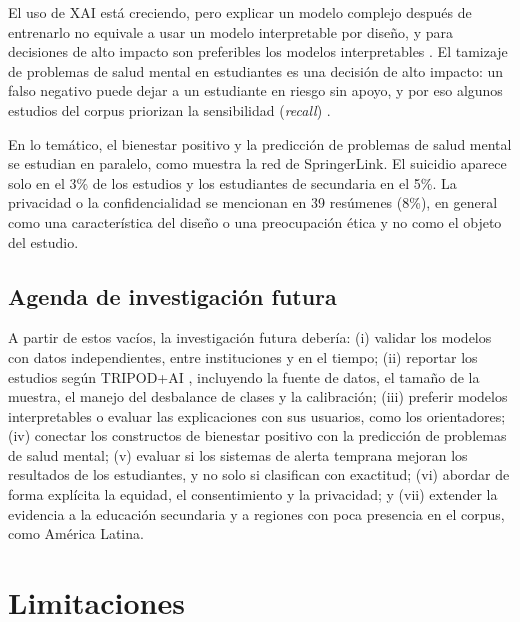 \documentclass[11pt,a4paper]{article}
\begin{document}
El uso de XAI está creciendo, pero explicar un modelo complejo después de entrenarlo no equivale a usar un modelo interpretable por diseño, y para decisiones de alto impacto son preferibles los modelos interpretables \cite{rudin2019blackbox}. El tamizaje de problemas de salud mental en estudiantes es una decisión de alto impacto: un falso negativo puede dejar a un estudiante en riesgo sin apoyo, y por eso algunos estudios del corpus priorizan la sensibilidad (\emph{recall}) \cite{S008}.

En lo temático, el bienestar positivo y la predicción de problemas de salud mental se estudian en paralelo, como muestra la red de SpringerLink. El suicidio aparece solo en el 3\% de los estudios y los estudiantes de secundaria en el 5\%. La privacidad o la confidencialidad se mencionan en 39 resúmenes (8\%), en general como una característica del diseño o una preocupación ética y no como el objeto del estudio.

\subsection{Agenda de investigación futura}

A partir de estos vacíos, la investigación futura debería: (i) validar los modelos con datos independientes, entre instituciones y en el tiempo; (ii) reportar los estudios según TRIPOD+AI \cite{collins2024tripodai}, incluyendo la fuente de datos, el tamaño de la muestra, el manejo del desbalance de clases y la calibración; (iii) preferir modelos interpretables o evaluar las explicaciones con sus usuarios, como los orientadores; (iv) conectar los constructos de bienestar positivo con la predicción de problemas de salud mental; (v) evaluar si los sistemas de alerta temprana mejoran los resultados de los estudiantes, y no solo si clasifican con exactitud; (vi) abordar de forma explícita la equidad, el consentimiento y la privacidad; y (vii) extender la evidencia a la educación secundaria y a regiones con poca presencia en el corpus, como América Latina.

\section{Limitaciones}\label{sec:limitations}
\end{document}
